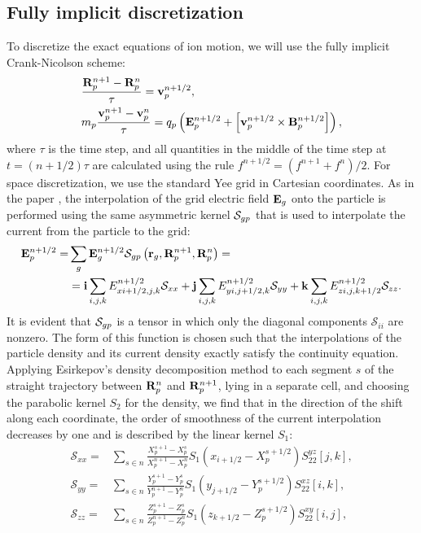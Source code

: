 \documentclass[final,3p]{elsarticle}
\begin{document}
\subsection{Fully implicit discretization}\label{s22}

To discretize the exact equations of ion motion, we will use the fully implicit Crank-Nicolson scheme:
\begin{align}
  &\frac{{\bf R}_p^{n+1}-{\bf R}_p^{n}}{\tau}={\bf v}_p^{n+1/2}, \\
	&m_p\frac{{\bf v}_p^{n+1}-{\bf v}_p^{n}}{\tau}=q_p \left({\bf E}_p^{n+1/2}+\left[{\bf v}_p^{n+1/2}\times{{\bf B}_p^{n+1/2}}\right]\right), 
\end{align}
where $\tau$ is the time step, and all quantities in the middle of the time step at $t=(n+1/2)\tau$ are calculated using the rule $f^{n+1/2}=(f^{n+1}+f^n)/2$. For space discretization, we use the standard Yee grid in Cartesian coordinates. As in the paper \cite{Chen2023}, the interpolation of the grid  electric field ${\bf E}_g$ onto the particle is performed using the same asymmetric kernel ${\bf \mathcal{S}}_{gp}$ that is used to interpolate the current from the particle to the grid:
\begin{align}
	{\bf E}_p^{n+1/2}=&\sum\limits_{g} {\bf E}_g^{n+1/2} {\bf \mathcal{S}}_{gp}\left({\bf r}_g,{\bf R}_p^{n+1},{\bf R}_p^{n}\right)=\nonumber \\
	&={\bf i}\sum\limits_{i,j,k} E_{xi+1/2,j,k}^{n+1/2} \mathcal{S}_{xx}+{\bf j}\sum\limits_{i,j,k} E_{yi,j+1/2,k}^{n+1/2} \mathcal{S}_{yy}+{\bf k}\sum\limits_{i,j,k} E_{zi,j,k+1/2}^{n+1/2} \mathcal{S}_{zz}. \label{ef}
\end{align}
It is evident that ${\bf \mathcal{S}}_{gp}$ is a tensor in which only the diagonal components $\mathcal{S}_{ii}$ are nonzero. The form of this function is chosen such that the interpolations of the particle density and its current density exactly satisfy the continuity equation. Applying Esirkepov's density decomposition method to each segment $s$ of the straight trajectory between ${\bf R}_p^n$ and ${\bf R}_p^{n+1}$, lying in a separate cell, and choosing the parabolic kernel $S_2$ for the density, we find that in the direction of the shift along each coordinate, the order of smoothness of the current interpolation decreases by one and is described by the linear kernel $S_1$:
\begin{align}
	\mathcal{S}_{xx}=&\sum\limits_{s\in n}\frac{X_p^{s+1}-X_p^s}{X_p^{n+1}-X_p^n} S_1(x_{i+1/2}-X_p^{s+1/2}) S_{22}^{yz}[j,k], \\
	\mathcal{S}_{yy}=&\sum\limits_{s\in n}\frac{Y_p^{s+1}-Y_p^s}{Y_p^{n+1}-Y_p^n} S_1(y_{j+1/2}-Y_p^{s+1/2}) S_{22}^{xz}[i,k], \\
	\mathcal{S}_{zz}=&\sum\limits_{s\in n}\frac{Z_p^{s+1}-Z_p^s}{Z_p^{n+1}-Z_p^n} S_1(z_{k+1/2}-Z_p^{s+1/2}) S_{22}^{xy}[i,j],
\end{align}
\end{document}
